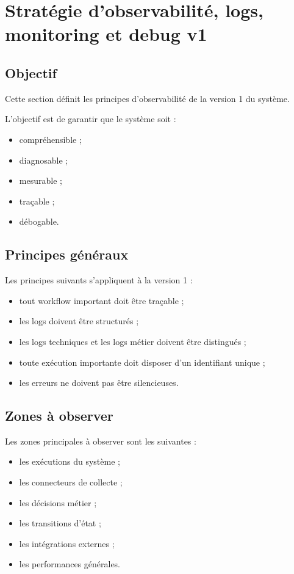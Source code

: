 \documentclass[11pt,a4paper]{article}
\begin{document}
\section{Stratégie d’observabilité, logs, monitoring et debug v1}

\subsection{Objectif}

Cette section définit les principes d’observabilité de la version 1 du système.

L’objectif est de garantir que le système soit :

\begin{itemize}
    \item compréhensible ;
    \item diagnosable ;
    \item mesurable ;
    \item traçable ;
    \item débogable.
\end{itemize}

\subsection{Principes généraux}

Les principes suivants s’appliquent à la version 1 :

\begin{itemize}
    \item tout workflow important doit être traçable ;
    \item les logs doivent être structurés ;
    \item les logs techniques et les logs métier doivent être distingués ;
    \item toute exécution importante doit disposer d’un identifiant unique ;
    \item les erreurs ne doivent pas être silencieuses.
\end{itemize}

\subsection{Zones à observer}

Les zones principales à observer sont les suivantes :

\begin{itemize}
    \item les exécutions du système ;
    \item les connecteurs de collecte ;
    \item les décisions métier ;
    \item les transitions d’état ;
    \item les intégrations externes ;
    \item les performances générales.
\end{itemize}
\end{document}
